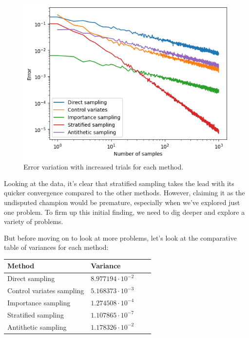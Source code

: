 \documentclass{article}
\begin{document}
\begin{figure}[H]
\centering
\includegraphics[width=0.5\linewidth]{./Figures/VarianceReduction/comparison.png}
\caption{Error variation with increased trials for each method.}
\label{fig:comparisonvariancereduction}
\end{figure}

Looking at the data, it’s clear that stratified sampling takes the lead with its quicker convergence compared to the other methods. However, claiming it as the undisputed champion would be premature, especially when we’ve explored just one problem. To firm up this initial finding, we need to dig deeper and explore a variety of problems.

But before moving on to look at more problems, let's look at the comparative table of variances for each method:

\begin{center}
	\begin{tabular}{ |p{5cm}||p{3cm}|p{3cm}|p{3cm}|  }
		\hline
		Method & Variance \\
		\hline
		\hline
		Direct sampling   			& \(8.977194 \cdot 10^{-2}\) \\
		\hline
		Control variates sampling 	& \(5.168373 \cdot 10^{-3}\) \\
		\hline
		Importance sampling      	& \(1.274508 \cdot 10^{-4}\) \\
		\hline
		Stratified sampling       	& \(1.107865 \cdot 10^{-7}\) \\
		\hline
		Antithetic sampling      	& \(1.178326 \cdot 10^{-2}\) \\
		\hline
	\end{tabular}
\end{center}
\end{document}
